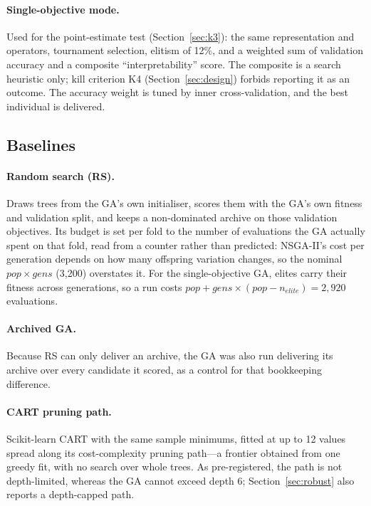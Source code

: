 \documentclass[11pt]{article}
\newcommand{\GA}{GA\xspace}
\newcommand{\RS}{RS\xspace}
\begin{document}
\paragraph{Single-objective mode.} Used for the point-estimate test
(Section~\ref{sec:k3}): the same representation and operators, tournament selection,
elitism of 12\%, and a weighted sum of validation accuracy and a composite
``interpretability'' score. The composite is a search heuristic only; kill criterion K4
(Section~\ref{sec:design}) forbids reporting it as an outcome. The accuracy weight is
tuned by inner cross-validation, and the best individual is delivered.

\subsection{Baselines}
\paragraph{Random search (\RS).} Draws trees from the \GA's own initialiser, scores them
with the \GA's own fitness and validation split, and keeps a non-dominated archive on
those validation objectives. Its budget is set per fold to the number of evaluations the
\GA actually spent on that fold, read from a counter rather than predicted: NSGA-II's cost
per generation depends on how many offspring variation changes, so the nominal
$\mathit{pop}\times\mathit{gens}$ (3{,}200) overstates it. For the single-objective \GA,
elites carry their fitness across generations, so a run costs
$\mathit{pop}+\mathit{gens}\times(\mathit{pop}-n_\mathit{elite})=2{,}920$ evaluations.

\paragraph{Archived \GA.} Because \RS{} can only deliver an archive, the \GA was also run
delivering its archive over every candidate it scored, as a control for that bookkeeping
difference.

\paragraph{CART pruning path.} Scikit-learn CART \citep{pedregosa2011} with the same
sample minimums, fitted at up to 12 values spread along its cost-complexity pruning
path---a frontier obtained from one greedy fit, with no search over whole trees. As
pre-registered, the path is not depth-limited, whereas the \GA cannot exceed depth 6;
Section~\ref{sec:robust} also reports a depth-capped path.
\end{document}
